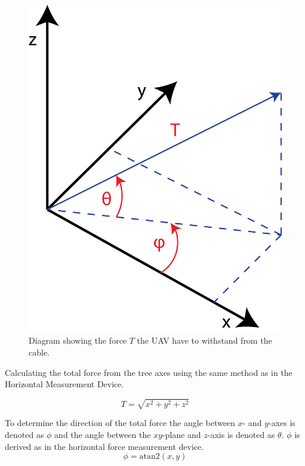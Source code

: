 \begin{figure}[hbtp]
\centering
\includegraphics[scale=0.5]{graphics/UAV-force-diagram.png}
\caption[Force diagram for UAV]{Diagram showing the force $T$ the UAV have to withstand from the cable.}
\end{figure}

\noindent
Calculating the total force from the tree axes using the same method as in the Horizontal Measurement Device.

\begin{equation}
T = \sqrt{x^2+y^2+z^2}
\end{equation} 

\noindent
To determine the direction of the total force the angle between $x$- and $y$-axes is denoted as $\phi$ and the angle between the $xy$-plane and $z$-axis is denoted as $\theta$.
$\phi$ is derived as in the horizontal force measurement device.
\begin{equation}
\phi = \mathrm{atan2}(x,y)
\end{equation}

